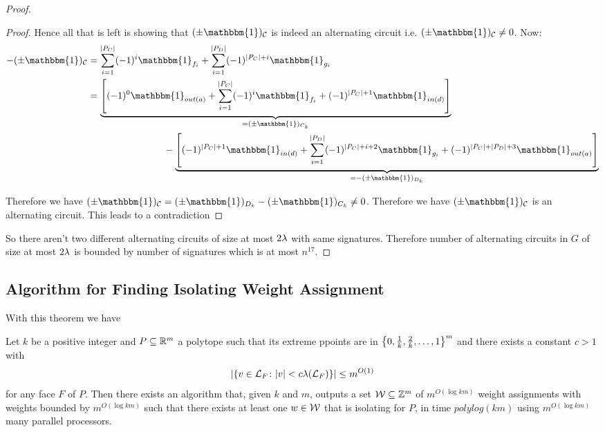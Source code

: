 \begin{proof}
\begin{proof}
		Hence all that is left is showing that $(\pm\mathbbm{1}  )_{\mathcal{C} }$ is indeed an alternating circuit i.e. $(\pm\mathbbm{1} )_{\mathcal{C} }\neq 0$. Now:
		\begin{align*}
			-(\pm\mathbbm{1} )_{\mathcal{C} } & = \sum\limits_{i=1}^{|P_C|} (-1)^i\mathbbm{1} _{f_i}+\sum\limits_{i=1}^{|P_D|} (-1)^{|P_C|+i}\mathbbm{1} _{g_i}\\
						                                                                                                                                                     &=\underbrace{\left[ (-1)^0\mathbbm{1} _{out(a)}+\sum\limits_{i=1}^{|P_C|} (-1)^i\mathbbm{1} _{f_i} + (-1)^{|P_C|+1}\mathbbm{1} _{in(d)}\right]}_{=(\pm \mathbbm{1} )_{C_k}}\\ 
																																											 &\qquad\qquad\qquad\qquad -\underbrace{\left[(-1)^{|P_C|+1}\mathbbm{1} _{in(d)}+\sum\limits_{i=1}^{|P_D|} (-1)^{|P_C|+i+2}\mathbbm{1} _{g_i}+(-1)^{{|P_C|+|P_D|}+3}\mathbbm{1} _{out(a)}\right]}_{=-(\pm \mathbbm{1} )_{D_k}}
		\end{align*}
	
		Therefore we have $(\pm \mathbbm{1} )_{\mathcal{C} }=(\pm\mathbbm{1} )_{D_k}-(\pm \mathbbm{1} )_{C_k}\neq 0$. Therefore we have $(\pm \mathbbm{1} )_{\mathcal{C} }$ is an alternating circuit. This leads to a contradiction
	\end{proof}

So there aren't two different alternating circuits of size at most $2\lambda$ with same signatures. Therefore number of alternating circuits in $G$ of size at most $2\lambda$ is bounded by number of signatures which is at most $n^{17}$.
\end{proof}
\subsection{Algorithm for Finding Isolating Weight Assignment}
With this theorem we have \begin{Theorem}{\cite[Theorem 2.5]{GurjarThieraufVishnoi_2021_IaV}}{}
	Let $k$ be a positive integer and $P\subseteq \mathbb{R}^{m}$ a polytope such that its extreme ppoints are in $\left\{0,\frac1k,\frac2k,\dots,1\right\}^m$ and there exists a constant $c>1$ with $$|\{v\in \mathcal{L}_F\colon |v|<c\lambda(\mathcal{L}_F)\}|\leq m^{O(1)}$$ for any face $F$ of $P$. Then there exists an algorithm that, given $k$ and $m$, outputs a set $\mathcal{W}\subseteq \mathbb{Z}^m$ of $m^{O(\log km)}$ weight assignments with weights bounded by $m^{O(\log km)}$ such that there exists at least one $w\in \mathcal{W}$ that is isolating for $P$, in time $polylog(km)$ using $m^{O(\log km)}$ many parallel processors.
\end{Theorem}


